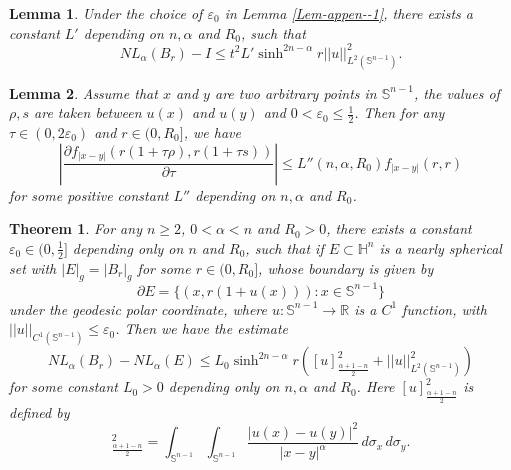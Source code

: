 \documentclass[10pt,a4paper]{amsart}
\newtheorem{thm}{Theorem}
\newtheorem{lem}{Lemma}
\begin{document}
\begin{lem}\label{Lem-appen_0}
	Under the choice of $\varepsilon_0$ in Lemma \ref{Lem-appen--1}, there exists a constant $L'$ depending on $n,\alpha$ and $R_0$, such that 
	\begin{equation}
		NL_{\alpha}(B_r)-I\leq t^2L'\sinh^{2n-\alpha} r||u||^2_{L^2(\mathbb{S}^{n-1})}.
	\end{equation}
\end{lem}

\begin{lem}\label{Lem-appen}
	Assume that $x$ and $y$ are two arbitrary points in $\mathbb{S}^{n-1}$, the values of $\rho, s$ are taken between $u(x)$ and $u(y)$ and $0<\varepsilon_0\leq\frac{1}{2}$. Then for any $\tau\in(0,2\varepsilon_0)$ and $r\in(0,R_0]$, we have 
	\begin{equation}
			\left|\frac{\partial f_{|x-y|}(r(1+\tau\rho),r(1+\tau s))}{\partial\tau}\right|\leq L''(n,\alpha,R_0)f_{|x-y|}(r,r)
	\end{equation}
for some positive constant $L''$ depending on $n,\alpha$ and $R_0$.
\end{lem}

\begin{thm}\label{Thm-Fuglede}
	For any $n\geq 2$, $0<\alpha<n$ and $R_0>0$, there exists a constant $\varepsilon_0\in(0,\frac{1}{2}]$ depending only on $n$ and $R_0$, such that if $E\subset\mathbb{H}^n$ is a nearly spherical set with $|E|_g=|B_r|_g$ for some $r\in(0,R_0]$, whose boundary is given by 
	\begin{equation}\label{Eq-Fuglede}
		\partial E=\{(x,r(1+u(x))):x\in\mathbb{S}^{n-1}\}
	\end{equation}
	under the geodesic polar coordinate, where $u:\mathbb{S}^{n-1}\to\mathbb{R}$ is a $C^1$ function, with $||u||_{C^1(\mathbb{S}^{n-1})}\leq\varepsilon_0$. Then we have the estimate 
	\begin{equation}\label{Eq-F1}
		NL_{\alpha}(B_r)-NL_{\alpha}(E)\leq L_0{\sinh}^{2n-\alpha} r\left([u]^2_{\frac{\alpha+1-n}{2}}+||u||^2_{L^2(
			\mathbb{S}^{n-1})}\right)
	\end{equation}
	for some constant $L_0>0$ depending only on $n,\alpha$ and $R_0$. Here $[u]^2_{\frac{\alpha+1-n}{2}}$ is defined by
	\begin{equation*}
		[u]^2_{\frac{\alpha+1-n}{2}}=\int_{\mathbb{S}^{n-1}}\int_{\mathbb{S}^{n-1}}\frac{|u(x)-u(y)|^2}{|x-y|^{\alpha}}\,d\sigma_x\,d\sigma_y.
	\end{equation*}
\end{thm}  
\end{document}
